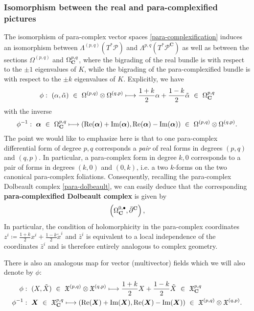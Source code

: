 \documentclass[letterpaper,12pt]{article}
\newcommand{\XX}{\mathfrak{X}}
\newcommand{\PS}{\mathcal{P}}
\newcommand{\ap}{\alpha}
\newcommand{\p}{\partial}
\newcommand{\xt}{{\tilde{x}}}
\def\tl{\tilde}
\theoremstyle{definition}
\theoremstyle{remark}
\theoremstyle{examples}
\begin{document}
\subsubsection{Isomorphism between the real and para-complexified pictures}
The isomorphism of para-complex vector spaces \eqref{para-complexification} induces an isomorphism between $\Lambda^{(p,q)}(T^*\PS)$ and $\Lambda^{p,q}(T^*\PS^\mathbf{C})$ as well as between the sections $\Omega^{(p,q)}$ and $\Omega_{\mathbf{C}}^{p,q}$, where the bigrading of the real bundle is with respect to the $\pm 1$ eigenvalues of $K$, while the bigrading of the para-complexified bundle is with respect to the $\pm k$ eigenvalues of $K$. Explicitly, we have
\begin{align}\label{isom_bigradings1}
\phi:\ (\ap,\tl{\ap})\ \in\ \Omega^{(p,q)}\otimes \Omega^{(q,p)}\longmapsto \frac{1+k}{2}\ap + \frac{1-k}{2}\tl{\ap}\ \in\ \Omega_\Cp^{p,q}
\end{align}
with the inverse
\begin{align}\label{isom_bigradings2}
\phi^{-1}:\ \bm{\ap}\ \in\ \Omega_\Cp^{p,q}\longmapsto (\text{Re}(\bm{\alpha})+\text{Im}(\bm{\ap}),\text{Re}(\bm{\alpha})-\text{Im}(\bm{\ap}))\ \in\ \Omega^{(p,q)}\otimes \Omega^{(q,p)}.
\end{align}
The point we would like to emphasize here is that to one para-complex differential form of degree $p,q$ corresponds a {\it pair} of real forms in degrees $(p,q)$ and $(q,p)$. In particular, a para-complex form in degree $k,0$ corresponds to a pair of forms in degrees $(k,0)$ and $(0,k)$, i.e. a two $k$-forms on the two canonical para-complex foliations. Consequently, recalling the para-complex Dolbeault complex \eqref{para-dolbeault}, we can easily deduce that the corresponding {\bf para-complexified Dolbeault complex} is given by
\begin{align}
\left( \Omega^{0,\bullet}_\Cp,\bar{\p}^\Cp\right),
\end{align}
In particular, the condition of holomorphicity in the para-complex coordinates $z^i\coloneqq \frac{1+k}{2}x^i+\frac{1-k}{2}\xt^i$ and $\bar{z}^i$ is equivalent to a local independence of the coordinates $\bar{z}^i$ and is therefore entirely analogous to complex geometry.

There is also an analogous map for vector (multivector) fields which we will also denote by $\phi$:
\begin{align*}
\phi&:\ (X,\tl{X})\ \in\ \XX^{(p,q)}\otimes \XX^{(q,p)}\longmapsto \frac{1+k}{2}X + \frac{1-k}{2}\tl{X}\ \in\ \XX_\Cp^{p,q}\\
\phi^{-1}&:\ \bm{X}\ \in\ \XX_\Cp^{p,q}\longmapsto (\text{Re}(\bm{X})+\text{Im}(\bm{X}),\text{Re}(\bm{X})-\text{Im}(\bm{X}))\ \in\ \XX^{(p,q)}\otimes \XX^{(q,p)}.
\end{align*}
\end{document}
